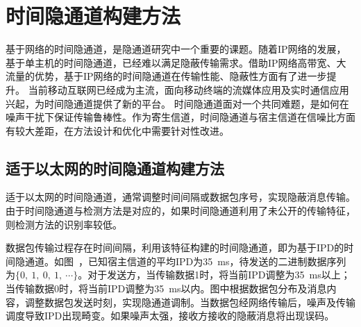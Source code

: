 \section{时间隐通道构建方法}
\label{chap:backinfo:ctc}

基于网络的时间隐通道，是隐通道研究中一个重要的课题。随着IP网络的发展，基于单主机的时间隐通道，已经难以满足隐蔽传输需求。借助IP网络高带宽、大流量的优势，基于IP网络的时间隐通道在传输性能、隐蔽性方面有了进一步提升。
当前移动互联网已经成为主流，面向移动终端的流媒体应用及实时通信应用兴起，为时间隐通道提供了新的平台。
时间隐通道面对一个共同难题，是如何在噪声干扰下保证传输鲁棒性。作为寄生信道，时间隐通道与宿主信道在信噪比方面有较大差距，在方法设计和优化中需要针对性改进。

\subsection{适于以太网的时间隐通道构建方法}
\label{chap:backinfo:ctc:ethernet}
适于以太网的时间隐通道，通常调整时间间隔或数据包序号，实现隐蔽消息传输。由于时间隐通道与检测方法是对应的，如果时间隐通道利用了未公开的传输特征，则检测方法的识别率较低。


数据包传输过程存在时间间隔，利用该特征构建的时间隐通道，即为基于IPD的时间隐通道。如图\ ，已知宿主信道的平均IPD为{35\ ms}，待发送的二进制数据序列为$\{0,\ 1,\ 0,\ 1,\ \cdots\}$。对于发送方，当传输数据1时，将当前IPD调整为{35\ ms}以上；当传输数据0时，将当前IPD调整为{35\ ms}以内。图中根据数据包分布及消息内容，调整数据包发送时刻，实现隐通道调制。当数据包经网络传输后，噪声及传输调度导致IPD出现畸变。如果噪声太强，接收方接收的隐蔽消息将出现误码。


